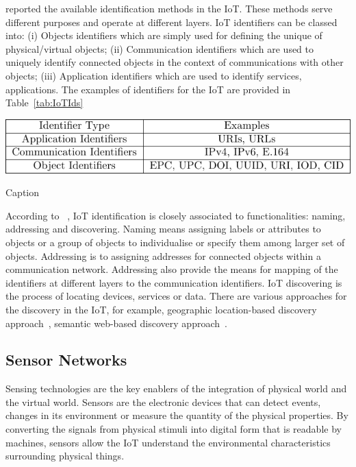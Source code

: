 \cite{Presser:2016} reported the available identification methods in the IoT. 
These methods serve different purposes and operate at different layers.
IoT identifiers can be classed into: 
(i) Objects identifiers which are simply used for defining the unique of physical/virtual objects;
(ii) Communication identifiers which are used to uniquely identify connected objects in the context of communications with other objects;
(iii) Application identifiers which are used to identify services, applications. 
The examples of identifiers for the IoT are provided in Table~\ref{tab:IoTIds}


\begin{table}[ht!]
    \centering
    \includegraphics[scale=1.25]{Table/2-1-identfication.pdf}
    \caption{Caption}
    \label{tab:IoTIds}
\end{table}

According to ~\cite{Presser:2016}, IoT identification is closely associated to functionalities: naming, addressing and discovering. 
Naming means assigning labels or attributes to objects or a group of objects to individualise or specify them among larger set of objects.
Addressing is to assigning addresses for connected objects within a communication network.
Addressing also provide the means for mapping of the identifiers at different layers to the communication identifiers.
IoT discovering is the process of locating devices, services or data. 
There are various approaches for the discovery in the IoT, for example, geographic location-based discovery approach~\citep{Dinh:2017}, semantic web-based discovery approach~\citep{Serena:2017}.

\subsection{Sensor Networks}

Sensing technologies are the key enablers of the integration of physical world and the virtual world.
Sensors are the electronic devices that can detect events, changes in its environment or measure the quantity of the physical properties.
By converting the signals from physical stimuli into digital form that is readable by machines, sensors allow the IoT understand the environmental characteristics surrounding physical things.

